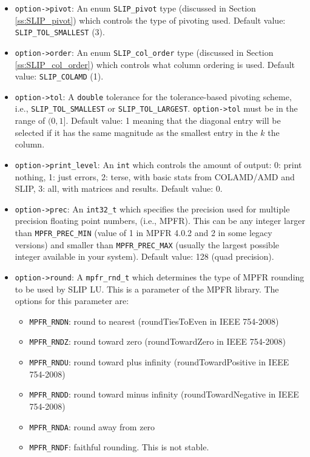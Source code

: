 \documentclass[12pt]{article}
\theoremstyle{definition}
\begin{document}
\begin{itemize}
\item
\verb|option->pivot|: An enum \verb|SLIP_pivot| type (discussed in Section
\ref{ss:SLIP_pivot}) which controls the type of pivoting used. Default value:
\verb|SLIP_TOL_SMALLEST| (3).

\item
\verb|option->order|: An enum \verb|SLIP_col_order| type (discussed in Section
\ref{ss:SLIP_col_order}) which controls what column ordering is used. Default
value: \verb|SLIP_COLAMD| (1).

\item
\verb|option->tol|: A \verb|double| tolerance for
the tolerance-based pivoting scheme, i.e., \verb|SLIP_TOL_SMALLEST| or
\verb|SLIP_TOL_LARGEST|. \verb|option->tol| must be in the range of $(0,1]$.
Default value: 1 meaning that the diagonal entry will be selected if it has the
same magnitude as the smallest entry in the $k$ the column.

\item
\verb|option->print_level|: An \verb|int| which controls the amount of
output:
0: print nothing, 1: just errors, 2: terse, with basic stats from
COLAMD/AMD and SLIP, 3: all, with matrices and results. Default value: 0.

\item
\verb|option->prec|: An \verb|int32_t| which specifies the precision used
for multiple precision floating point numbers, (i.e., MPFR). This
can be any integer larger than \verb|MPFR_PREC_MIN| (value of 1 in MPFR 4.0.2
and 2 in some legacy versions) and smaller than \verb|MPFR_PREC_MAX| (usually
the largest possible integer available in your system). Default value: 128
(quad precision).

\item
\verb|option->round|: A \verb|mpfr_rnd_t| which determines the type
of MPFR rounding to be used by SLIP LU. This is a parameter of the MPFR
library. The options for this parameter are:

    \begin{itemize}
        \item \verb|MPFR_RNDN|: round to nearest
            (roundTiesToEven in IEEE 754-2008)
        \item \verb|MPFR_RNDZ|: round toward zero
            (roundTowardZero in IEEE 754-2008)
        \item \verb|MPFR_RNDU|: round toward plus infinity
            (roundTowardPositive in IEEE 754-2008)
        \item \verb|MPFR_RNDD|: round toward minus infinity
            (roundTowardNegative in IEEE 754-2008)
        \item \verb|MPFR_RNDA|: round away from zero
        \item \verb|MPFR_RNDF|: faithful rounding. This is not stable.
    \end{itemize}


\end{itemize}
\end{document}
